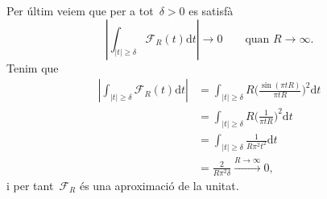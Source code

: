 \documentclass[a4paper]{article}
\theoremstyle{definition}
\newcommand{\uppi}{\pi}
\newcommand{\diff}{\mathrm{d}}
\newcommand{\abs}[1]{\lvert{#1}\rvert}
\newcommand{\Abs}[1]{\left\lvert{#1}\right\rvert}
\newcommand{\F}{\mathcal{F}}
\begin{document}
Per últim veiem que per a tot~\(\delta > 0\) es satisfà
\[
    \Abs{\int_{\abs{t}\geq\delta} \F_{R}(t)\diff t} \to 0
    \qquad
    \text{quan }
    R \to \infty.
\]
Tenim que
\begin{align*}
    \Abs{\int_{\abs{t}\geq\delta} \F_{R}(t) \diff t}
        &= \int_{\abs{t}\geq\delta}
           R\biggl(\frac{\sin(\uppi tR)}{\uppi tR}\biggr)^{2}
           \diff t \\
        &= \int_{\abs{t}\geq\delta}
           R\biggl(\frac{1}{\uppi tR}\biggr)^{2}
           \diff t \\
        &= \int_{\abs{t}\geq\delta}
           \frac{1}{R\uppi^{2}t^{2}}
           \diff t \\
        &= \frac{2}{R\uppi^{2}\delta} \xrightarrow{R\to\infty} 0,
\end{align*}
i per tant~\(\F_{R}\) és una aproximació de la unitat.
\end{document}
